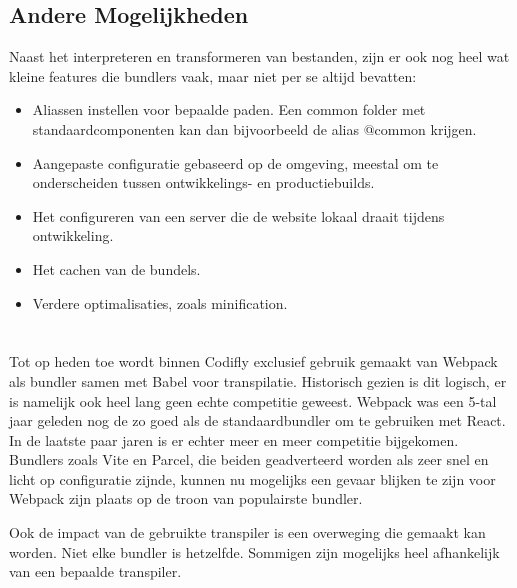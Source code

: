 \subsection{Andere Mogelijkheden}

Naast het interpreteren en transformeren van bestanden, zijn er ook nog heel wat kleine features die bundlers vaak, maar niet per se altijd bevatten:

\begin{itemize}
    \item Aliassen instellen voor bepaalde paden. Een common folder met standaardcomponenten kan dan bijvoorbeeld de alias @common krijgen.
    \item Aangepaste configuratie gebaseerd op de omgeving, meestal om te onderscheiden tussen ontwikkelings- en productiebuilds.
    \item Het configureren van een server die de website lokaal draait tijdens ontwikkeling.
    \item Het cachen van de bundels.
    \item Verdere optimalisaties, zoals minification.
\end{itemize}

\section{}
\label{sec:probleemstelling}

Tot op heden toe wordt binnen Codifly exclusief gebruik gemaakt van Webpack als bundler samen met Babel voor transpilatie. Historisch gezien is dit logisch, er is namelijk ook heel lang geen echte competitie geweest. Webpack was een 5-tal jaar geleden nog de zo goed als de standaardbundler om te gebruiken met React. In de laatste paar jaren is er echter meer en meer competitie bijgekomen. Bundlers zoals Vite en Parcel, die beiden geadverteerd worden als zeer snel en licht op configuratie zijnde, kunnen nu mogelijks een gevaar blijken te zijn voor Webpack zijn plaats op de troon van populairste bundler.

Ook de impact van de gebruikte transpiler is een overweging die gemaakt kan worden. Niet elke bundler is hetzelfde. Sommigen zijn mogelijks heel afhankelijk van een bepaalde transpiler.


